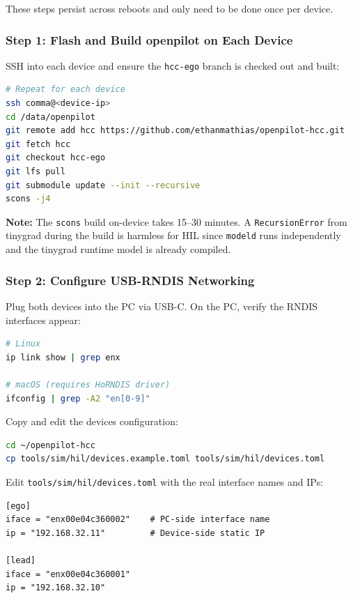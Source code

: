 \documentclass[11pt, letterpaper]{article}
\newcommand{\warn}[1]{%
  \medskip\noindent\colorbox{warnbg}{\parbox{\dimexpr\linewidth-2\fboxsep}{%
    \textbf{Note:} #1}}\medskip}
\begin{document}
These steps persist across reboots and only need to be done once per
device.

\subsubsection{Step 1: Flash and Build openpilot on Each Device}

SSH into each device and ensure the \texttt{hcc-ego} branch is checked
out and built:

\begin{lstlisting}[language=bash]
# Repeat for each device
ssh comma@<device-ip>
cd /data/openpilot
git remote add hcc https://github.com/ethanmathias/openpilot-hcc.git
git fetch hcc
git checkout hcc-ego
git lfs pull
git submodule update --init --recursive
scons -j4
\end{lstlisting}

\warn{The \texttt{scons} build on-device takes 15--30 minutes.  A
\texttt{RecursionError} from tinygrad during the build is harmless for
HIL since \texttt{modeld} runs independently and the tinygrad runtime
model is already compiled.}

\subsubsection{Step 2: Configure USB-RNDIS Networking}

Plug both devices into the PC via USB-C.  On the PC, verify the RNDIS
interfaces appear:

\begin{lstlisting}[language=bash]
# Linux
ip link show | grep enx

# macOS (requires HoRNDIS driver)
ifconfig | grep -A2 "en[0-9]"
\end{lstlisting}

Copy and edit the devices configuration:

\begin{lstlisting}[language=bash]
cd ~/openpilot-hcc
cp tools/sim/hil/devices.example.toml tools/sim/hil/devices.toml
\end{lstlisting}

Edit \texttt{tools/sim/hil/devices.toml} with the real interface names
and IPs:

\begin{lstlisting}
[ego]
iface = "enx00e04c360002"    # PC-side interface name
ip = "192.168.32.11"         # Device-side static IP

[lead]
iface = "enx00e04c360001"
ip = "192.168.32.10"
\end{lstlisting}
\end{document}
